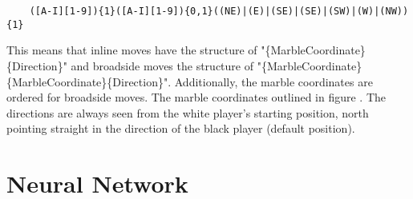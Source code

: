 \begin{BVerbatim}
    ([A-I][1-9]){1}([A-I][1-9]){0,1}((NE)|(E)|(SE)|(SE)|(SW)|(W)|(NW)){1}
\end{BVerbatim}

This means that inline moves have the structure of "\{MarbleCoordinate\}\{Direction\}" and broadside moves the structure of "\{MarbleCoordinate\}\{MarbleCoordinate\}\{Direction\}". Additionally, the marble coordinates are ordered for broadside moves. The marble coordinates outlined in figure . The directions are always seen from the white player's starting position, north pointing straight in the direction of the black player (default position).

\section{Neural Network}

